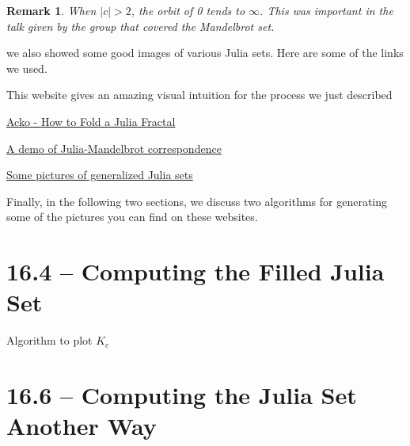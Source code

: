 \documentclass[symmetric]{tufte-handout}
\newtheorem{rmk}{Remark}
\begin{document}
\begin{rmk}
When $|c| > 2$, the orbit of 0 tends to $\infty$. This was important in the talk given by the group that
covered the Mandelbrot set.
\end{rmk}



 we also showed some good images of various Julia sets. Here are some of the links we used.

This website gives an amazing visual intuition for the process we just described
\begin{itemize}
{\color{DeepSkyBlue4}
	\item \href{http://acko.net/blog/how-to-fold-a-julia-fractal/}{Acko - How to Fold a Julia Fractal}
	\item \href{http://demonstrations.wolfram.com/JuliaSetsAndTheMandelbrotSet/}{A demo of Julia-Mandelbrot correspondence}
	\item \href{http://www.juliasets.dk/UFP.htm}{Some pictures of generalized Julia sets}
}
\end{itemize}

Finally, in the following two sections, we discuss two algorithms for generating some of the pictures
you can find on these websites. 

\section{16.4 -- Computing the Filled Julia Set}\label{sec:problem-1}


\begin{algorithm}[H]
  \DontPrintSemicolon
  \LinesNumbered


 {
}
\caption{Algorithm to plot $K_c$ }
\end{algorithm}







\section{16.6 -- Computing the Julia Set Another Way}\label{sec:problem-1}
\end{document}
